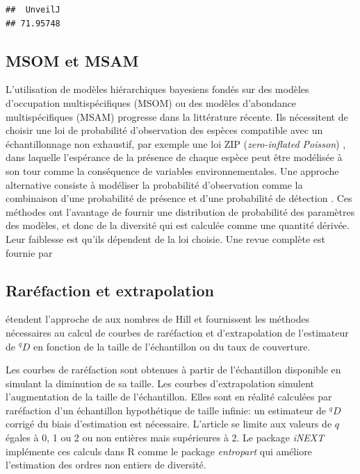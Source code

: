 \documentclass[
  11pt,
  french,
  a4paper,
  extrafontsizes,onecolumn,openright
  ]{memoir}
\begin{document}
\begin{verbatim}
##  UnveilJ 
## 71.95748
\end{verbatim}

\normalsize

\subsection{MSOM et MSAM}\label{msom-et-msam}

L'utilisation de modèles hiérarchiques bayesiens fondés sur des modèles d'occupation multispécifiques (MSOM) ou des modèles d'abondance multispécifiques (MSAM) progresse dans la littérature récente.
Ils nécessitent de choisir une loi de probabilité d'observation des espèces compatible avec un échantillonnage non exhaustif, par exemple une loi ZIP (\emph{zero-inflated Poisson}) \autocite{Zhang2014c}, dans laquelle l'espérance de la présence de chaque espèce peut être modélisée à son tour comme la conséquence de variables environnementales.
Une approche alternative consiste à modéliser la probabilité d'observation comme la combinaison d'une probabilité de présence et d'une probabilité de détection \autocite{Broms2014}.
Ces méthodes ont l'avantage de fournir une distribution de probabilité des paramètres des modèles, et donc de la diversité qui est calculée comme une quantité dérivée. Leur faiblesse est qu'ils dépendent de la loi choisie. Une revue complète est fournie par \textcite{Iknayan2014}

\subsection{Raréfaction et extrapolation}\label{sec-RarExtrapol}

\textcite{Chao2014} étendent l'approche de \textcite{Gotelli2001} aux nombres de Hill et fournissent les méthodes nécessaires au calcul de courbes de raréfaction et d'extrapolation de l'estimateur de \(^{q}\!D\) en fonction de la taille de l'échantillon ou du taux de couverture.

Les courbes de raréfaction sont obtenues à partir de l'échantillon disponible en simulant la diminution de sa taille.
Les courbes d'extrapolation simulent l'augmentation de la taille de l'échantillon.
Elles sont en réalité calculées par raréfaction d'un échantillon hypothétique de taille infinie: un estimateur de \(^{q}\!D\) corrigé du biais d'estimation est nécessaire.
L'article se limite aux valeurs de \(q\) égales à 0, 1 ou 2 ou non entières mais supérieures à 2.
Le package \emph{iNEXT} \autocite{Hsieh2014} implémente ces calculs dans R comme le package \emph{entropart} qui améliore l'estimation des ordres non entiers de diversité.
\end{document}
